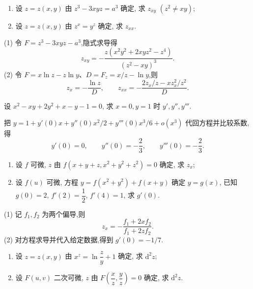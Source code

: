 
\begin{example}
    \begin{enumerate}
        \item 设 $z=z(x,y)$ 由 $z^3-3xyz=a^3$ 确定, 求 $z_{xy}$ $(z^2\ne xy)$;
        \item 设 $z=z(x,y)$ 由 $z^x=y^z$ 确定, 求 $z_{xx}$.
    \end{enumerate}
\end{example}
\exampleblank

\begin{solution}
    (1) 令 $F=z^3-3xyz-a^3$,隐式求导得
    \[
        z_{xy}=-\dfrac{z(x^2y^2+2xyz^2-z^4)}{(z^2-xy)^3}.
    \]
    (2) 令 $F=x\ln z-z\ln y$、$D=F_z=x/z-\ln y$,则
    \[
        z_x=-\dfrac{\ln z}{D},\qquad
        z_{xx}=-\dfrac{2z_x/z-xz_x^2/z^2}{D}.
    \]
\end{solution}

\begin{example}
    设 $x^2-xy+2y^2+x-y-1=0$, 求 $x=0,y=1$ 时 $y',y'',y'''$.
\end{example}
\exampleblank

\begin{solution}
    把 $y=1+y'(0)x+y''(0)x^2/2+y'''(0)x^3/6+o(x^3)$ 代回方程并比较系数,得
    \[
        y'(0)=0,\qquad y''(0)=-\dfrac{2}{3},\qquad y'''(0)=-\dfrac{2}{3}.
    \]
\end{solution}

\begin{example}
    \begin{enumerate}
        \item 设 $f$ 可微, $z$ 由 $f(x+y+z,x^2+y^2+z^2)=0$ 确定, 求 $z_x$;
        \item 设 $f(u)$ 可微, 方程 $y=f(x^2+y^2)+f(x+y)$ 确定 $y=g(x)$, 已知 $g(0)=2$, $f'(2)=\dfrac{1}{2}$, $f'(4)=1$, 求 $g'(0)$.
    \end{enumerate}
\end{example}
\exampleblank

\begin{solution}
    (1) 记 $f_1,f_2$ 为两个偏导,则
    \[
        z_x=-\dfrac{f_1+2xf_2}{f_1+2zf_2}.
    \]
    (2) 对方程求导并代入给定数据,得到 $g'(0)=-1/7$.
\end{solution}

\begin{example}
    \begin{enumerate}
        \item 设 $z=z(x,y)$ 由 $\displaystyle x^z=\ln\dfrac{z}{y}+1$ 确定, 求 $\mathrm{d}^2z$;
        \item 设 $F(u,v)$ 二次可微, $z$ 由 $\displaystyle F\left(\dfrac{x}{z},\dfrac{y}{z}\right)=0$ 确定, 求 $\mathrm{d}^2z$.
    \end{enumerate}
\end{example}
\exampleblank

